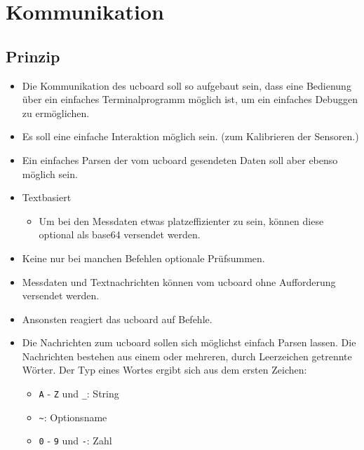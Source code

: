 
\chapter{Kommunikation}


\section{Prinzip}


\begin{itemize}
	\item Die Kommunikation des ucboard soll so aufgebaut sein, dass eine Bedienung über ein einfaches Terminalprogramm möglich ist, um ein einfaches Debuggen zu ermöglichen.
	\item Es soll eine einfache Interaktion möglich sein. (\ZB zum Kalibrieren der Sensoren.)
	\item Ein einfaches Parsen der vom ucboard gesendeten Daten soll aber ebenso möglich sein.
\end{itemize}


\begin{itemize}
	\item Textbasiert
		\begin{itemize}
			\item Um bei den Messdaten etwas platzeffizienter zu sein, können diese optional als base64 versendet werden.
		\end{itemize}
	\item Keine \bzw nur bei manchen Befehlen optionale Prüfsummen.
	\item Messdaten und Textnachrichten können vom ucboard ohne Aufforderung versendet werden.
	\item Ansonsten reagiert das ucboard auf Befehle.
\end{itemize}

\begin{itemize}
	\item Die Nachrichten zum ucboard sollen sich möglichst einfach Parsen lassen. Die Nachrichten bestehen aus einem oder mehreren, durch Leerzeichen getrennte Wörter. Der Typ eines Wortes ergibt sich aus dem ersten Zeichen:
		\begin{itemize}
			\item \texttt{A} - \texttt{Z} und \texttt{\_}: String
			\item \verb+~+: Optionsname
			\item \texttt{0} - \texttt{9} und \texttt{-}: Zahl
		\end{itemize}
\end{itemize}



